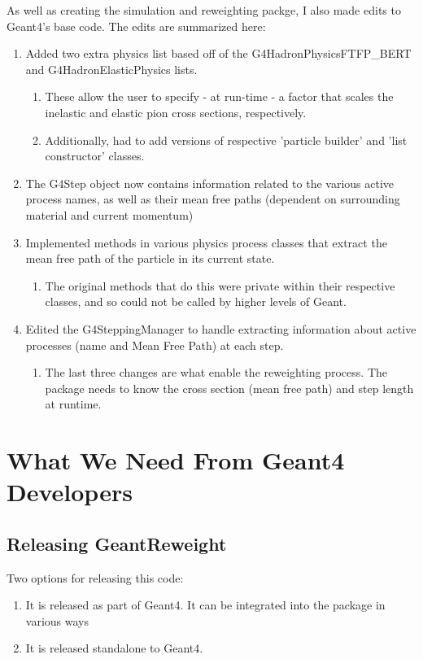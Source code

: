 \documentclass[12pt]{article}
\begin{document}
As well as creating the simulation and reweighting packge, I also made edits to Geant4's base code. The edits are summarized here:
\begin{enumerate}
\item Added two extra physics list based off of the G4HadronPhysicsFTFP\_BERT and G4HadronElasticPhysics lists. 
	\begin{enumerate}
	\item These allow the user to specify - at run-time - a factor that scales the inelastic and elastic pion cross sections, respectively. 
	\item Additionally, had to add versions of respective 'particle builder' and 'list constructor' classes. 
	\end{enumerate}
	
\item The G4Step object now contains information related to the various active process names, as well as their mean free paths (dependent on surrounding material and current momentum)
\item Implemented methods in various physics process classes that extract the mean free path of the particle in its current state.
	\begin{enumerate}
	\item The original methods that do this were private within their respective classes, and so could not be called by higher levels of Geant.

	\end{enumerate}
\item Edited the G4SteppingManager to handle extracting information about active processes (name and Mean Free Path) at each step.
	\begin{enumerate}
	\item The last three changes are what enable the reweighting process. The package needs to know the cross section (mean free path) and step length at runtime. 
	\end{enumerate}
\end{enumerate}

\section{What We Need From Geant4 Developers}

\subsection{Releasing GeantReweight}
Two options for releasing this code:
\begin{enumerate}
\item It is released as part of Geant4. It can be integrated into the package in various ways
\item It is released standalone to Geant4.
\end{enumerate}
\end{document}
